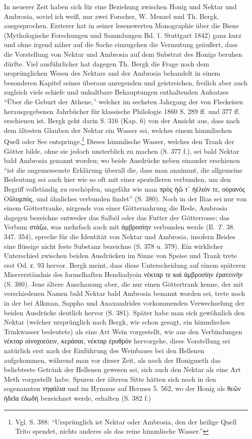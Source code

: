 \documentclass[a4paper, 11pt, oneside]{article}
\begin{document}
In neuerer Zeit haben sich für eine Beziehung zwischen Honig und Nektar und Ambrosia, soviel ich weiß, nur zwei Forscher, W. Menzel und Th. Bergk, ausgesprochen. Ersterer hat in seiner lesenswerten Monographie über die Biene (Mythologische Forschungen und Sammlungen Bd. 1. Stuttgart 1842) ganz kurz und ohne irgend näher auf die Sache einzugehen die Vermutung geäußert, dass die Vorstellung von Nektar und Ambrosia auf dem Substrat des Honigs beruhen dürfte. Viel ausführlicher hat dagegen Th. Bergk die Frage nach dem ursprünglichen Wesen des Nektars and der Ambrosia behandelt in einem besonderen Kapitel seines überaus anregenden und geistreichen, freilich aber auch zugleich viele schiefe und unhaltbare Behauptungen enthaltenden Aufsatzes "`Über die Geburt der Athene,"' welcher im sechsten Jahrgang der von Fleckeisen herausgegebenen Jahrbücher für klassische Philologie 1860 S. 289 ff. und 377 ff. erschienen ist. Bergk geht darin S. 316 (Kap. 6) von der Ansicht aus, dass nach dem ältesten Glauben der Nektar ein Wasser sei, welches einem himmlischen Quell oder See entspringe.\footnote{Vgl. S. 388: "`Ursprünglich ist Nektar oder Ambrosia, den der heilige Quell Trito spendet, nichts anderes als das reine himmlische Wasser."'} Dieses himmlische Wasser, welches den Trank der Götter bilde, ohne sie jedoch unsterblich zu machen (S. 377 f.), sei bald Nektar bald Ambrosia genannt worden; wo beide Ausdrücke neben einander erschienen "`ist die angemessenste Erklärung überall die, dass man annimmt, die allgemeine Bedeutung sei auch hier wie so oft mit einer spezielleren verbunden, um den Begriff vollständig zu erschöpfen, ungefähr wie man πρὸς ἠῶ τ᾽ ἠἑλιόν τε, οὐρανὸς Οὔλυμπός, und ähnliches verbunden findet"' (S. 380). Noch in der Ilias sei nur von einem Göttertranke, nirgends von einer Götternahrung die Rede, Ambrosia dagegen bezeichne entweder das Salböl oder das Futter der Götterrosse; das Verbum στάζω, was mehrfach auch mit ἀμβροσίην verbunden werde (Il. \emph{T.} 38. 347. 354), spreche für die Identität von Nektar und Ambrosia, insofern Beides eine flüssige nicht feste Substanz bezeichne (S. 378 u. 379). Ein wirklicher Unterschied zwischen beiden Ausdrücken im Sinne von Speise und Trank trete erst Od. ε. 93 hervor. Bergk meint, dass diese Unterscheidung auf einem späteren Missverständnis des formelhaften Hendiadyoin νέκταρ τε καὶ ἀμβροσίην ἐρατεινήν (S. 380). Jene ältere Anschauung aber, die nur einen Göttertrank kenne, der mit verschiedenen Namen bald Nektar bald Ambrosia benannt worden sei, trete noch in der bei Alkman, Sappho und Anaxandrides vorkommenden Verwechselung der beiden Ausdrücke deutlich hervor (S. 381). Später habe man sich gewöhnlich den Nektar (welcher ursprünglich nach Bergk, wie schon gesagt, ein himmlisches Trinkwasser bedeutete) als eine Art Wein vorgestellt, wie aus den Verbindungen νέκταρ οἰνοχοεύειν, κεράσαι, νέκταρ ἐρυθρόν hervorgehe, diese Vorstellung sei natürlich erst nach der Einführung des Weinbaues bei den Hellenen aufgekommen, während man vor dieser Zeit, als noch der Honigmeth das beliebteste Getränk der Hellenen gewesen sei, sich auch den Nektar als eine Art Meth vorgestellt habe. Spuren der älteren Sitte hätten sich noch in den sogenannten νηφάλια und im Hymnus auf Hermes 5. 562, wo der Honig als θεῶν ἡδεῖα ἐδωδή bezeichnet werde, erhalten (S. 382 f.)
\end{document}
